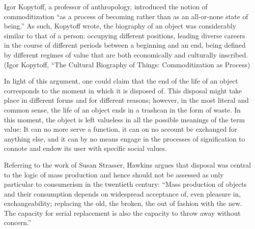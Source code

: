 Igor Kopytoff, a professor of anthropology, introduced the notion of commoditization “as a process of becoming rather than as an all-or-none state of being.” As such, Kopytoff wrote, the biography of an object was considerably similar to that of a person: occupying different positions, leading diverse careers in the course of different periods between a beginning and an end, being defined by different regimes of value that are both economically and culturally inscribed. (Igor Kopytoff, “The Cultural Biography of Things: Commoditization as Process)

In light of this argument, one could claim that the end of the life of an object corresponds to the moment in which it is disposed of. This disposal might take place in different forms and for different reasons; however, in the most literal and common sense, the life of an object ends in a trashcan in the form of waste. In this moment, the object is left valueless in all the possible meanings of the term value: It can no more serve a function, it can on no account be exchanged for anything else, and it can by no means engage in the processes of signification to connote and endow its user with specific social values.

Referring to the work of Susan Strasser, Hawkins argues that disposal was central to the logic of mass production and hence should not be assessed as only particular to consumerism in the twentieth century: “Mass production of objects and their consumption depends on widespread acceptance of, even pleasure in, exchangeability; replacing the old, the broken, the out of fashion with the new. The capacity for serial replacement is also the capacity to throw away without concern.”

